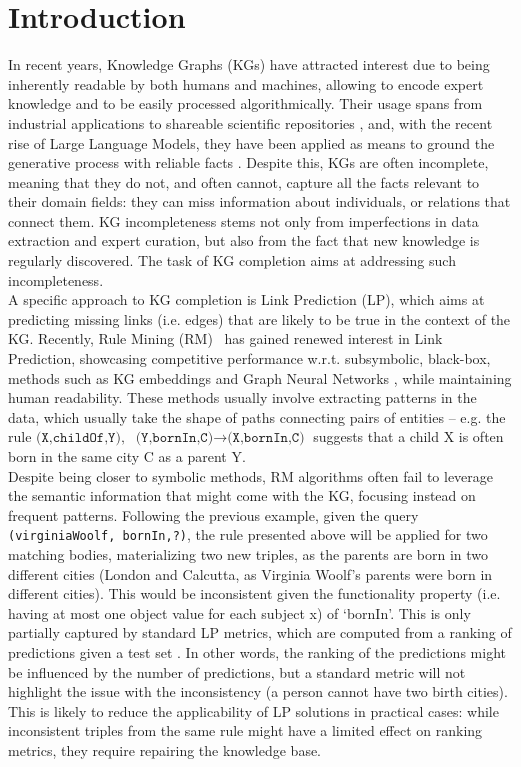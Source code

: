 \documentclass[a4paper,UKenglish,cleveref, autoref, thm-restate]{tgdk-v2021}
\begin{document}
\section{Introduction}
In recent years, Knowledge Graphs (KGs) \cite{hogan_knowledge_2022} have attracted interest due to being inherently readable by both humans and machines, allowing to encode expert knowledge and to be easily processed algorithmically. Their usage spans from industrial applications \cite{deng_research_2022,han_construction_2022,tang_exploring_2023} to shareable scientific repositories \cite{dessi_cs-kg_2025,himmelstein_systematic_2017,jaradeh_open_2019}, and, with the recent rise of Large Language Models, they have been applied as means to ground the generative process with reliable facts \cite{procko_graph_2024}. Despite this, KGs are often incomplete, meaning that they do not, and often cannot, capture all the facts relevant to their domain fields: they can miss information about individuals, or relations that connect them. KG incompleteness stems not only from imperfections in data extraction and expert curation, but also from the fact that new knowledge is regularly discovered. The task of KG completion aims at addressing such incompleteness. \\
\indent A specific approach to KG completion is Link Prediction (LP), which aims at predicting missing links (i.e. edges) that are likely to be true in the context of the KG. Recently, Rule Mining (RM)~\cite{harth_fast_2020,meilicke_anytime_2024} has gained renewed interest in Link Prediction, showcasing competitive performance w.r.t. subsymbolic, black-box, methods such as KG embeddings \cite{wang_knowledge_2017} and Graph Neural Networks \cite{ye_comprehensive_2022}, while maintaining human readability. These methods usually involve extracting patterns in the data, which usually take the shape of paths connecting pairs of entities -- e.g. the rule $\texttt{(X,childOf,Y)},$ $ \texttt{(Y,bornIn,C)} \rightarrow \texttt{(X,bornIn,C)}$ suggests that a child X is often born in the same city C as a parent Y. \\
\indent Despite being closer to symbolic methods, RM algorithms often fail to leverage the semantic information that might come with the KG, focusing instead on frequent patterns. 
Following the previous example, given the query \texttt{(virginiaWoolf, bornIn,?)}, the rule presented above will be applied for two matching bodies, materializing two new triples, as the parents are born in two different cities (London and Calcutta, as Virginia Woolf's parents were born in different cities). This would be inconsistent given the functionality property (i.e. having at most one object value for each subject x) of `bornIn'. This is only partially captured by standard LP metrics, which are computed from a ranking of predictions given a test set \cite{paulheim_knowledge_2016}. In other words, the ranking of the predictions might be influenced by the number of predictions, but a standard metric will not highlight the issue with the inconsistency (a person cannot have two birth cities). This is likely to reduce the applicability of LP solutions in practical cases: while inconsistent triples from the same rule might have a limited effect on ranking metrics, they require repairing the knowledge base.\\
\end{document}
